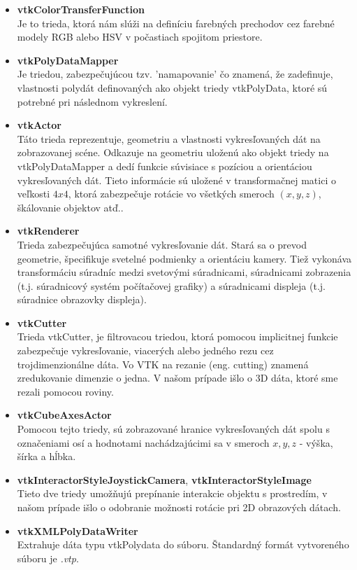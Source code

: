 \documentclass[a4paper,11pt,oneside]{article}%
\begin{document}
\begin{itemize}
\item \textbf{vtkColorTransferFunction} \\
Je to trieda, ktorá nám slúži na definíciu farebných prechodov cez farebné modely RGB alebo HSV v počastiach spojitom priestore. 

\item \textbf{vtkPolyDataMapper} \\
Je triedou, zabezpečujúcou tzv. 'namapovanie' čo znamená, že zadefinuje, vlastnosti polydát definovaných ako objekt triedy vtkPolyData, ktoré sú potrebné pri následnom vykreslení.

\item \textbf{vtkActor} \\
Táto trieda reprezentuje, geometriu a vlastnosti vykresľovaných dát na zobrazovanej scéne. Odkazuje na geometriu uloženú ako objekt triedy na vtkPolyDataMapper a dedí funkcie súvisiace s pozíciou a orientáciou vykresľovaných dát. Tieto informácie sú uložené v transformačnej matici o veľkosti $4x4$, ktorá zabezpečuje rotácie vo všetkých smeroch $(x, y, z)$, škálovanie objektov atď..

\item \textbf{vtkRenderer} \\
Trieda zabezpečujúca samotné vykresľovanie dát. Stará sa o prevod geometrie, špecifikuje svetelné podmienky a orientáciu kamery. Tiež vykonáva transformáciu súradníc medzi svetovými súradnicami, súradnicami zobrazenia (t.j. súradnicový systém počítačovej grafiky) a súradnicami displeja (t.j.  súradnice obrazovky displeja).

\item \textbf{vtkCutter} \\
Trieda vtkCutter, je filtrovacou triedou, ktorá pomocou implicitnej funkcie zabezpečuje vykresľovanie, viacerých alebo jedného rezu cez trojdimenzionálne dáta. Vo VTK na rezanie (eng. cutting) znamená zredukovanie dimenzie o jedna. V našom prípade išlo o 3D dáta, ktoré sme rezali pomocou roviny. 

\item \textbf{vtkCubeAxesActor} \\
Pomocou tejto triedy, sú zobrazované hranice vykresľovaných dát spolu s označeniami osí a  hodnotami nachádzajúcimi sa v smeroch $x, y, z$ - výška, šírka a hĺbka.

\item \textbf{vtkInteractorStyleJoystickCamera}, \textbf{vtkInteractorStyleImage}  \\
Tieto dve triedy umožňujú prepínanie interakcie objektu s prostredím, v našom prípade išlo o odobranie možnosti rotácie pri 2D obrazových dátach.

\item \textbf{vtkXMLPolyDataWriter} \\
Extrahuje dáta typu vtkPolydata do súboru. Štandardný formát vytvoreného súboru je \textit{.vtp}. 
\end{itemize}
\end{document}
